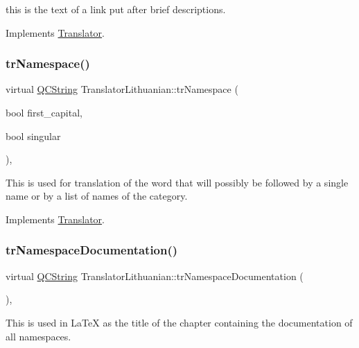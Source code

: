 this is the text of a link put after brief descriptions. 

Implements \mbox{\hyperlink{class_translator}{Translator}}.

\mbox{\label{class_translator_lithuanian_a953435479eb4e7fb66a2d98e32f20cb5}} 
\subsubsection{\texorpdfstring{trNamespace()}{trNamespace()}}
{\footnotesize\ttfamily virtual \mbox{\hyperlink{class_q_c_string}{Q\+C\+String}} Translator\+Lithuanian\+::tr\+Namespace (\begin{DoxyParamCaption}\item[{bool}]{first\+\_\+capital,  }\item[{bool}]{singular }\end{DoxyParamCaption})\hspace{0.3cm}{\ttfamily [inline]}, {\ttfamily [virtual]}}

This is used for translation of the word that will possibly be followed by a single name or by a list of names of the category. 

Implements \mbox{\hyperlink{class_translator}{Translator}}.

\mbox{\label{class_translator_lithuanian_a15290f7799114520bf0f51b6d4114227}} 
\subsubsection{\texorpdfstring{trNamespaceDocumentation()}{trNamespaceDocumentation()}}
{\footnotesize\ttfamily virtual \mbox{\hyperlink{class_q_c_string}{Q\+C\+String}} Translator\+Lithuanian\+::tr\+Namespace\+Documentation (\begin{DoxyParamCaption}{ }\end{DoxyParamCaption})\hspace{0.3cm}{\ttfamily [inline]}, {\ttfamily [virtual]}}

This is used in La\+TeX as the title of the chapter containing the documentation of all namespaces. 

